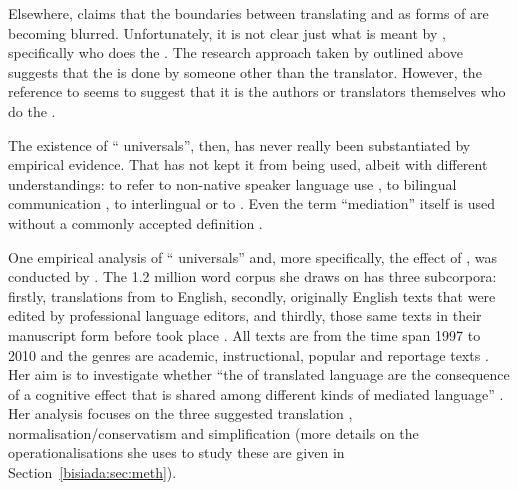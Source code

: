 \documentclass[output=paper]{LSP/langsci}
\begin{document}
Elsewhere, \textcite{ulrych09} claims that the boundaries between translating and  as forms of  are becoming blurred. Unfortunately, it is not clear just what is meant by , specifically who does the . The research approach taken by \textcite{ulrmur08} outlined above suggests that the  is done by someone other than the translator. However, the reference to  seems to suggest that it is the authors or translators themselves who do the  \parencite[for a valuable critique of the term \enquote{transediting}, see][]{schäffner12}.

The existence of \enquote{ universals}, then, has never really been substantiated by empirical evidence. That has not kept it from being used, albeit with different understandings: to refer to non-native speaker language use \parencites{ulrans08}{gasber10}[79]{rabizq13}[175]{xiahu15}, to bilingual communication \parencite{lanhel12}, to interlingual  \parencite[63]{robertson10} or to . Even the term \enquote{mediation} itself is used without a commonly accepted definition \parencites[for a totally unrelated use of the term \enquote{mediated discourse}, see][]{scollon01}{norjon05}.

One empirical analysis of \enquote{ universals} and, more specifically, the  effect of , was conducted by \textcite{kruger12}. The 1.2 million word corpus she draws on has three subcorpora: firstly, translations from  to English, secondly, originally English texts that were edited by professional language editors, and thirdly, those same texts in their manuscript form before  took place \parencite*[360]{kruger12}. All texts are from the time span 1997 to 2010 and the genres are academic, instructional, popular and reportage texts \parencite*[359]{kruger12}. Her aim is to investigate whether ``the  of translated language are the consequence of a cognitive  effect that is shared among different kinds of mediated language'' \citep[358]{kruger12}. Her analysis focuses on the three suggested translation  , normalisation\slash conservatism and simplification (more details on the operationalisations she uses to study these  are given in Section~\ref{bisiada:sec:meth}).
\end{document}

